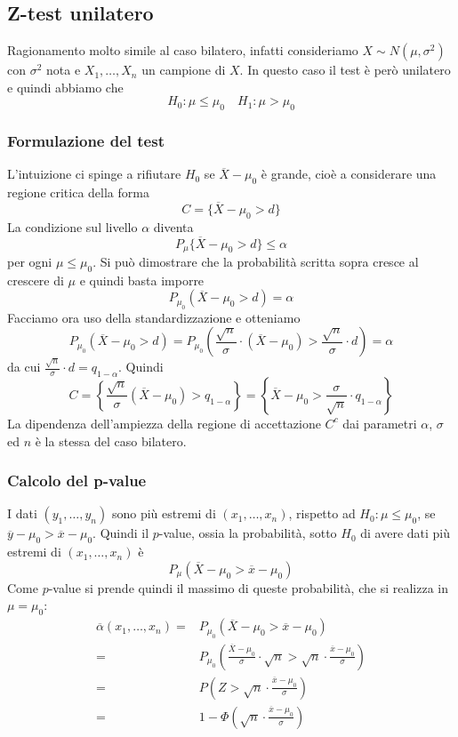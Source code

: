 \subsection{Z-test unilatero}
Ragionamento molto simile al caso bilatero, infatti consideriamo $X \sim N(\mu, \sigma^2)$ con
$\sigma^2$ nota e $X_1, \dots, X_n$ un campione \iid di $X$. In questo caso il test è però
unilatero e quindi abbiamo che
\[ H_0: \mu \leq \mu_0 \quad H_1: \mu > \mu_0 \]

\subsubsection{Formulazione del test}
L'intuizione ci spinge a rifiutare $H_0$ se $\overline{X} - \mu_0$ è grande, cioè a considerare
una regione critica della forma
\[ C = \{ \overline{X} - \mu_0 > d \} \]
La condizione sul livello $\alpha$ diventa
\[ P_\mu \{ \overline{X} - \mu_0 > d \} \leq \alpha \]
per ogni $\mu \leq \mu_0$. Si può dimostrare che la probabilità scritta sopra cresce al crescere
di $\mu$ e quindi basta imporre
\[ P_{\mu_0} (\overline{X} - \mu_0 > d) = \alpha \]
Facciamo ora uso della standardizzazione e otteniamo
\[
	P_{\mu_0} (\overline{X} - \mu_0 > d) =
	P_{\mu_0} \left( \frac{\sqrt{n}}{\sigma} \cdot (\overline{X} - \mu_0) >
	\frac{\sqrt{n}}{\sigma} \cdot d \right) = \alpha
\]
da cui $\frac{\sqrt{n}}{\sigma} \cdot d = q_{1-\alpha}$. Quindi
\[
	C = \left\{ \frac{\sqrt{n}}{\sigma} (\overline{X} - \mu_0) > q_{1-\alpha} \right\}
	= \left\{ \overline{X} - \mu_0 > \frac{\sigma}{\sqrt{n}} \cdot q_{1-\alpha} \right\}
\]
La dipendenza dell'ampiezza della regione di accettazione $C^c$ dai parametri $\alpha$, $\sigma$
ed $n$ è la stessa del caso bilatero.

\subsubsection{Calcolo del p-value}
I dati $(y_1, \dots, y_n)$ sono più estremi di $(x_1, \dots, x_n)$, rispetto ad
$H_0: \mu \leq \mu_0$, se $\overline{y} - \mu_0 > \overline{x} - \mu_0$. Quindi il $p$-value,
ossia la probabilità, sotto $H_0$ di avere dati più estremi di $(x_1, \dots, x_n)$ è
\[ P_\mu \left( \overline{X} - \mu_0 > \overline{x} - \mu_0 \right) \]
Come $p$-value si prende quindi il massimo di queste probabilità, che si realizza in $\mu = \mu_0$:
\begin{align*}
	\overline{\alpha} (x_1, \dots, x_n)
	= & P_{\mu_0} \left( \overline{X} - \mu_0 > \overline{x} - \mu_0 \right)       \\
	= & P_{\mu_0} \left( \frac{\overline{X} - \mu_0}{\sigma} \cdot \sqrt{n} >
	\sqrt{n} \cdot \frac{\overline{x} - \mu_0}{\sigma} \right)                     \\
	= & P \left( Z > \sqrt{n} \cdot \frac{\overline{x} - \mu_0}{\sigma} \right)    \\
	= & 1 - \Phi \left( \sqrt{n} \cdot \frac{\overline{x} - \mu_0}{\sigma} \right)
\end{align*}

